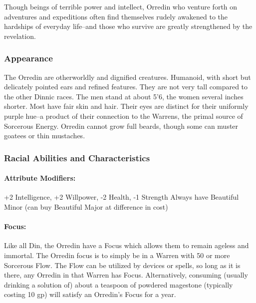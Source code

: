 \documentclass[oneside,11pt,english]{book}
\begin{document}
Though beings of terrible power and intellect, Orredin who venture forth on adventures and expeditions 
often find themselves rudely awakened to the hardships of everyday life--and those who survive are 
greatly strengthened by the revelation. 
\subsubsection*{Appearance} 
The Orredin are otherworldly and dignified creatures. Humanoid, with short but delicately pointed ears 
and refined features. They are not very tall compared to the other Dinnic races. The men stand at about 
5’6, the women several inches shorter. Most have fair skin and hair. Their eyes are distinct for their 
uniformly purple hue--a product of their connection to the Warrens, the primal source of Sorcerous 
Energy. Orredin cannot grow full beards, though some can muster goatees or thin mustaches. 

 

 

\subsubsection*{Racial Abilities and Characteristics} 

 

\paragraph{Attribute Modifiers:} +2 Intelligence, +2 Willpower, -2 Health, -1 Strength 
Always have Beautiful Minor (can buy Beautiful Major at difference in cost) 

 

\paragraph{Focus:} Like all Din, the Orredin have a Focus which allows them to remain ageless and immortal. The 
Orredin focus is to simply be in a Warren with 50 or more Sorcerous Flow. The Flow can be utilized by 
devices or spells, so long as it is there, any Orredin in that Warren has Focus. Alternatively, consuming 
(usually drinking a solution of) about a teaspoon of powdered magestone (typically costing 10 gp) will 
satisfy an Orredin's Focus for a year. 
\end{document}
